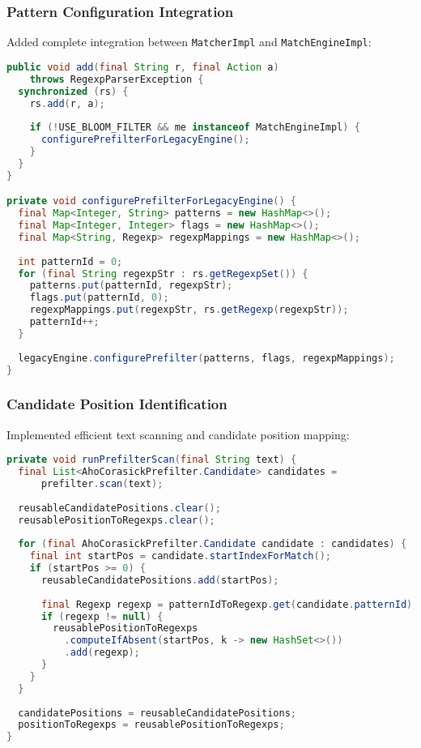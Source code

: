 \documentclass[11pt,a4paper]{article}
\begin{document}
\subsubsection{Pattern Configuration Integration}
Added complete integration between \texttt{MatcherImpl} and \texttt{MatchEngineImpl}:

\begin{lstlisting}[language=Java, caption=Automatic prefilter configuration]
public void add(final String r, final Action a) 
    throws RegexpParserException {
  synchronized (rs) {
    rs.add(r, a);
    
    if (!USE_BLOOM_FILTER && me instanceof MatchEngineImpl) {
      configurePrefilterForLegacyEngine();
    }
  }
}

private void configurePrefilterForLegacyEngine() {
  final Map<Integer, String> patterns = new HashMap<>();
  final Map<Integer, Integer> flags = new HashMap<>();
  final Map<String, Regexp> regexpMappings = new HashMap<>();
  
  int patternId = 0;
  for (final String regexpStr : rs.getRegexpSet()) {
    patterns.put(patternId, regexpStr);
    flags.put(patternId, 0);
    regexpMappings.put(regexpStr, rs.getRegexp(regexpStr));
    patternId++;
  }
  
  legacyEngine.configurePrefilter(patterns, flags, regexpMappings);
}
\end{lstlisting}

\subsubsection{Candidate Position Identification}
Implemented efficient text scanning and candidate position mapping:

\begin{lstlisting}[language=Java, caption=Prefilter candidate identification]
private void runPrefilterScan(final String text) {
  final List<AhoCorasickPrefilter.Candidate> candidates = 
      prefilter.scan(text);
  
  reusableCandidatePositions.clear();
  reusablePositionToRegexps.clear();
  
  for (final AhoCorasickPrefilter.Candidate candidate : candidates) {
    final int startPos = candidate.startIndexForMatch();
    if (startPos >= 0) {
      reusableCandidatePositions.add(startPos);
      
      final Regexp regexp = patternIdToRegexp.get(candidate.patternId);
      if (regexp != null) {
        reusablePositionToRegexps
          .computeIfAbsent(startPos, k -> new HashSet<>())
          .add(regexp);
      }
    }
  }
  
  candidatePositions = reusableCandidatePositions;
  positionToRegexps = reusablePositionToRegexps;
}
\end{lstlisting}
\end{document}
